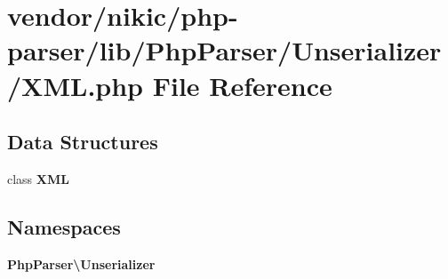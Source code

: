 \section{vendor/nikic/php-\/parser/lib/\+Php\+Parser/\+Unserializer/\+X\+M\+L.php File Reference}
\label{nikic_2php-parser_2lib_2_php_parser_2_unserializer_2_x_m_l_8php}
\subsection*{Data Structures}
\begin{DoxyCompactItemize}
\item 
class {\bf X\+M\+L}
\end{DoxyCompactItemize}
\subsection*{Namespaces}
\begin{DoxyCompactItemize}
\item 
 {\bf Php\+Parser\textbackslash{}\+Unserializer}
\end{DoxyCompactItemize}
